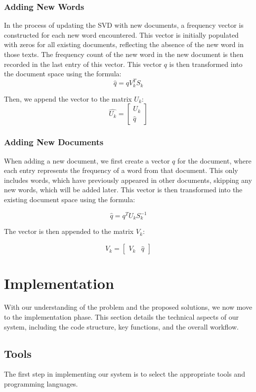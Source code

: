\documentclass[12pt,a4paper]{article}
\begin{document}
\subsubsection{Adding New Words}

In the process of updating the SVD with new documents, a frequency vector is constructed for each new word encountered. This vector is initially populated with zeros for all existing documents, reflecting the absence of the new word in those texts. The frequency count of the new word in the new document is then recorded in the last entry of this vector. This vector $q$ is then transformed into the document space using the formula:
\[ \hat{q} = q V^T_k S_k \]

\noindent Then, we append the vector to the matrix $U_k$:
\[ \hat{U_k} = \begin{bmatrix} U_k \\ \hat{q} \end{bmatrix} \]

\subsubsection{Adding New Documents}

When adding a new document, we first create a vector $q$ for the document, where each entry represents the frequency of a word from that document. This only includes words, which have previously appeared in other documents, skipping any new words, which will be added later. This vector is then transformed into the existing document space using the formula:

\[ \hat{q} = q^T U_k S^{-1}_k \]

\noindent The vector is then appended to the matrix $V_k$:

\[ \hat{V_k} = \begin{bmatrix} V_k & \hat{q} \end{bmatrix} \]

\newpage
\section{Implementation}
    With our understanding of the problem and the proposed solutions, we now move to the implementation phase. This section details the technical aspects of our system, including the code structure, key functions, and the overall workflow.

    \subsection{Tools}
    The first step in implementing our system is to select the appropriate tools and programming languages. 
    
\end{document}
